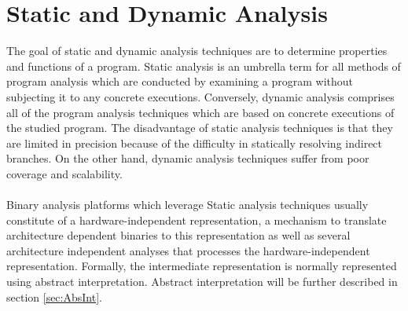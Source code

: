 \documentclass{kththesis}
\newcommand{\fbcomment}[1]{{#1}}
\renewcommand{\fbcomment}[1]{}
\begin{document}
\section{Static and Dynamic Analysis}
\fbcomment{\color{red}Goal: Explain challenges of static analysis. Also, pros and cons of using static and dynamic analysis}
The goal of static and dynamic analysis techniques are to determine properties and
functions of a program\cite{staticOfInd}. Static analysis is an umbrella term for all methods of program analysis which are conducted by examining a program without subjecting it to any concrete executions. Conversely, dynamic analysis comprises all of the program analysis techniques which are based on concrete executions of the studied program. The disadvantage of static analysis techniques is that they are limited in precision because of the difficulty in statically resolving indirect
branches\cite{preciseCFGBoolean}. On the other hand, dynamic analysis techniques suffer from poor coverage and scalability\cite{preciseCFGBoolean}.
\\ \\
Binary analysis platforms which leverage Static analysis techniques usually constitute of a hardware-independent representation, a mechanism to translate architecture dependent binaries to this representation as well as several architecture independent analyses that processes the hardware-independent representation\cite{TrABin}. Formally, the intermediate representation is normally represented using abstract interpretation\cite{Jakstab}. Abstract interpretation will be further described in section \ref{sec:AbsInt}.
\end{document}
